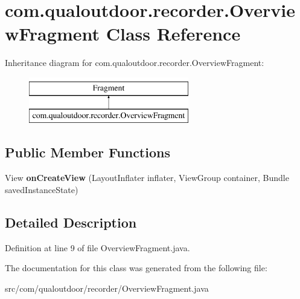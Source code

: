 \hypertarget{classcom_1_1qualoutdoor_1_1recorder_1_1OverviewFragment}{\section{com.\-qualoutdoor.\-recorder.\-Overview\-Fragment Class Reference}
\label{classcom_1_1qualoutdoor_1_1recorder_1_1OverviewFragment}
}
Inheritance diagram for com.\-qualoutdoor.\-recorder.\-Overview\-Fragment\-:\begin{figure}[H]
\begin{center}
\leavevmode
\includegraphics[height=2.000000cm]{classcom_1_1qualoutdoor_1_1recorder_1_1OverviewFragment}
\end{center}
\end{figure}
\subsection*{Public Member Functions}
\begin{DoxyCompactItemize}
\item 
\hypertarget{classcom_1_1qualoutdoor_1_1recorder_1_1OverviewFragment_ab0fd9f82a732308d4e6595d6708c58d7}{View {\bfseries on\-Create\-View} (Layout\-Inflater inflater, View\-Group container, Bundle saved\-Instance\-State)}\label{classcom_1_1qualoutdoor_1_1recorder_1_1OverviewFragment_ab0fd9f82a732308d4e6595d6708c58d7}

\end{DoxyCompactItemize}


\subsection{Detailed Description}


Definition at line 9 of file Overview\-Fragment.\-java.



The documentation for this class was generated from the following file\-:\begin{DoxyCompactItemize}
\item 
src/com/qualoutdoor/recorder/Overview\-Fragment.\-java\end{DoxyCompactItemize}
